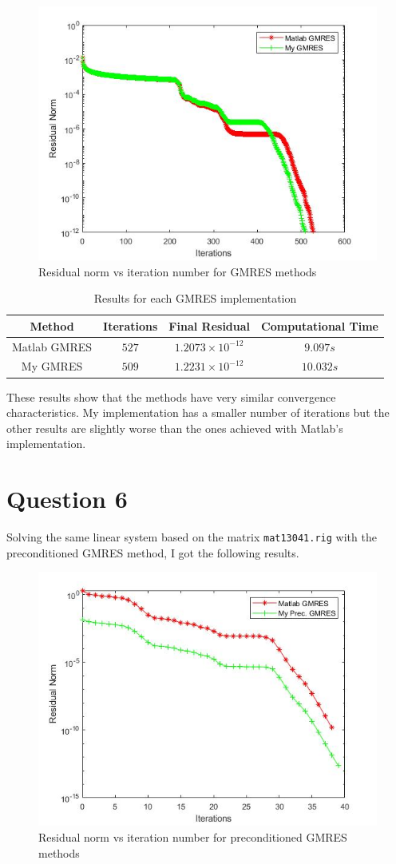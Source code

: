 \documentclass[a4paper, 11pt]{article}
\begin{document}
			\begin{figure}[H]
				\centering
				\includegraphics[width=.6\linewidth]{ex5.jpg}
				\caption{Residual norm vs iteration number for GMRES methods}
				\label{fig:ex5}
			\end{figure}
		
			\begin{table}[H]
				\centering
				\begin{tabular}{c|c|c|c}
					\textbf{Method} &  \textbf{Iterations} 	& \textbf{Final Residual} 		& \textbf{Computational Time} 	\\ \hline
					Matlab GMRES	& 			$527$ 		& $ 1.2073 \times 10^{-12} $ 	& $ 9.097 s $	\\ \hline
					My GMRES		& 			$509$ 		& $ 1.2231 \times 10^{-12} $ 	& $ 10.032 s $	\\ 
				\end{tabular}
				\caption{Results for each GMRES implementation}
				\label{table:ex5}
			\end{table}
			
			These results show that the methods have very similar convergence characteristics.
			My implementation has a smaller number of iterations but the other results are slightly worse than the ones achieved with Matlab's implementation.
					
		\section*{Question 6}
			Solving the same linear system based on the matrix \texttt{mat13041.rig} with the preconditioned GMRES method, I got the following results.
			
			\begin{figure}[H]
				\centering
				\includegraphics[width=.6\linewidth]{ex6.jpg}
				\caption{Residual norm vs iteration number for preconditioned GMRES methods}
				\label{fig:ex6}
			\end{figure}
			
\end{document}
